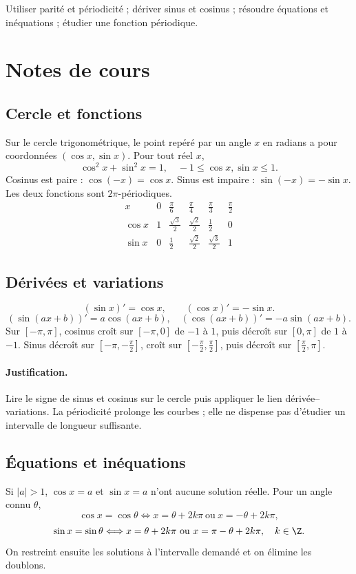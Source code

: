 \label{ch:5}


\begin{keypoint}[Objectifs]Utiliser parité et périodicité ; dériver sinus et cosinus ; résoudre équations et inéquations ; étudier une fonction périodique.\end{keypoint}

\section{Notes de cours}
\subsection{Cercle et fonctions}
Sur le cercle trigonométrique, le point repéré par un angle $x$ en radians a pour coordonnées $(\cos x,\sin x)$. Pour tout réel $x$,
\[\cos^2x+\sin^2x=1,\quad -1\le\cos x,\sin x\le1.\]
Cosinus est paire : $\cos(-x)=\cos x$. Sinus est impaire : $\sin(-x)=-\sin x$. Les deux fonctions sont $2\pi$-périodiques.
\[\begin{array}{c|ccccc}x&0&\frac{\pi}{6}&\frac{\pi}{4}&\frac{\pi}{3}&\frac{\pi}{2}\\\hline
\cos x&1&\frac{\sqrt{3}}{2}&\frac{\sqrt{2}}{2}&\frac{1}{2}&0\\
\sin x&0&\frac{1}{2}&\frac{\sqrt{2}}{2}&\frac{\sqrt{3}}{2}&1
\end{array}\]
\subsection{Dérivées et variations}
\[(\sin x)'=\cos x,\qquad(\cos x)'=-\sin x.\]\[
(\sin(ax+b))'=a\cos(ax+b),\quad(\cos(ax+b))'=-a\sin(ax+b).\]
Sur $[-\pi,\pi]$, cosinus croît sur $[-\pi,0]$ de $-1$ à $1$, puis décroît sur $[0,\pi]$ de $1$ à $-1$. Sinus décroît sur $[-\pi,-\frac{\pi}{2}]$, croît sur $[-\frac{\pi}{2},\frac{\pi}{2}]$, puis décroît sur $[\frac{\pi}{2},\pi]$.
\paragraph{Justification.} Lire le signe de sinus et cosinus sur le cercle puis appliquer le lien dérivée--variations. La périodicité prolonge les courbes ; elle ne dispense pas d'étudier un intervalle de longueur suffisante.
\subsection{Équations et inéquations}
Si $|a|>1$, $\cos x=a$ et $\sin x=a$ n'ont aucune solution réelle. Pour un angle connu $\theta$,
\[\cos x=\cos\theta\Longleftrightarrow x=\theta+2k\pi\ \text{ou}\ x=-\theta+2k\pi,\]
\[\sin x=\sin\theta\Longleftrightarrow x=\theta+2k\pi\ \text{ou}\ x=\pi-\theta+2k\pi,\quad k\in\Z.\]
On restreint ensuite les solutions à l'intervalle demandé et on élimine les doublons.
